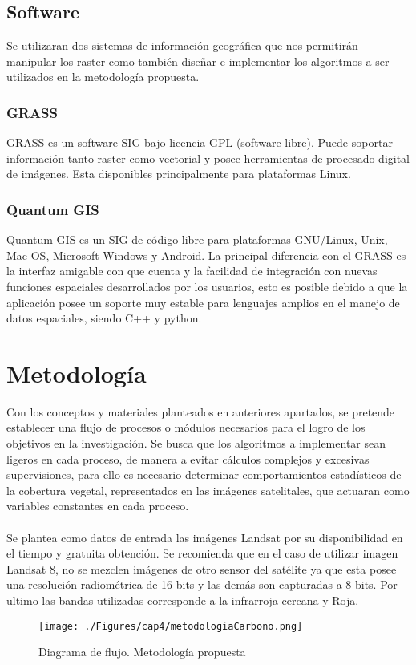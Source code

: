 \subsection{Software}
Se utilizaran dos sistemas de informaci\'on geogr\'afica que nos permitir\'an manipular los raster como tambi\'en dise\~{n}ar e implementar los algoritmos a ser utilizados en la metodolog\'ia propuesta.
\subsubsection{GRASS}\label{sec:grass}
GRASS es un software SIG  bajo licencia GPL (software libre). Puede soportar informaci\'on tanto raster como vectorial y posee herramientas de procesado digital de im\'agenes. Esta disponibles principalmente para plataformas Linux.
\subsubsection{Quantum GIS}\label{sec:quantum}
Quantum GIS es un SIG de c\'odigo libre para plataformas GNU/Linux, Unix, Mac OS, Microsoft Windows y Android. La principal diferencia con el GRASS es la interfaz amigable con que cuenta y la facilidad de integraci\'on con nuevas funciones espaciales desarrollados por los usuarios, esto es posible debido a que la aplicaci\'on posee un soporte muy estable para lenguajes amplios en el manejo de datos espaciales, siendo C++ y python.
\section{Metodolog\'ia}
Con los conceptos y materiales planteados en anteriores apartados, se pretende establecer una flujo de procesos o m\'odulos necesarios para el logro de los objetivos en la investigaci\'on. Se busca que los algoritmos a implementar sean ligeros en cada proceso, de manera a evitar c\'alculos complejos y excesivas supervisiones, para ello es necesario determinar comportamientos estad\'isticos de la cobertura vegetal, representados en las im\'agenes satelitales, que actuaran como variables constantes en cada proceso.\\~\\
Se plantea como datos de entrada las im\'agenes Landsat por su disponibilidad en el tiempo y gratuita obtenci\'on. Se recomienda que en el caso de utilizar imagen Landsat 8, no se mezclen im\'agenes de otro sensor del sat\'elite ya que esta posee una resoluci\'on radiom\'etrica de 16 bits y las dem\'as son capturadas a 8 bits. Por ultimo las bandas utilizadas corresponde a la infrarroja cercana y Roja.
\begin{figure}[H]
	\centering
	\texttt{[image: ./Figures/cap4/metodologiaCarbono.png]}
	\caption{Diagrama de flujo. Metodolog\'ia propuesta}
	\label{fig:metodologiapc}
\end{figure}


